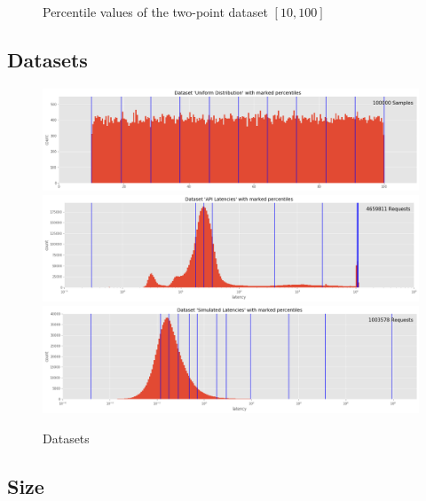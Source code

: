 \documentclass{article}
\theoremstyle{plain}
\theoremstyle{remark}
\begin{document}
\begin{figure}
  \centering
  
  \caption{Percentile values of the two-point dataset $[10,100]$}
\end{figure}

\clearpage
\subsection{Datasets}

\begin{figure}
   \includegraphics[width=\textwidth]{evaluation/images/Uniform_Distribution_distribution_percentiles.png}
   \includegraphics[width=\textwidth]{evaluation/images/API_Latencies_distribution_percentiles.png}
   \includegraphics[width=\textwidth]{evaluation/images/Simulated_Latencies_distribution_percentiles.png}
   \caption{Datasets}
\end{figure}

\clearpage
\subsection{Size}
\end{document}
